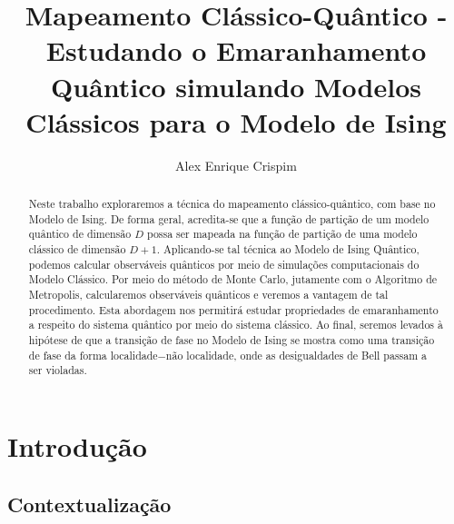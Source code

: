 

\newtheorem{theorem}{Teorema}

\newcommand{\conf}[1]{ \{ #1 \} }
\newcommand{\sconf}{\conf{\sigma}}
\newcommand{\sz}{\hat{\sigma}^z}
\newcommand{\sx}{\hat{\sigma}^x}
\newcommand{\sy}{\hat{\sigma}^y}
\newcommand{\aOper}{\hat{a}}
\newcommand{\aDagg}{\aOper^\dagger}
\newcommand{\cOpr}{\hat{c}}
\newcommand{\cDagg}{\cOper^\dagger}
\newcommand{\bq}{\beta_q}
\newcommand{\bcl}{\beta_{cl}}
\newcommand{\ham}{\hat{H}}
\newcommand{\oper}{\mathcal{O}}

\usepackage{tensor}

\title{Mapeamento Clássico-Quântico - Estudando o Emaranhamento Quântico  simulando Modelos Clássicos para o Modelo de Ising}
\author{Alex Enrique Crispim}

\begin{abstract}
Neste trabalho exploraremos a técnica do mapeamento clássico-quântico, com base no Modelo de Ising. De forma geral, acredita-se que a função de partição de um modelo quântico de dimensão $D$ possa ser mapeada na função de partição de uma modelo clássico de dimensão $D+1$. Aplicando-se tal técnica ao Modelo de Ising Quântico, podemos calcular observáveis quânticos por meio de simulações computacionais do Modelo Clássico. Por meio do método de Monte Carlo, jutamente com o Algoritmo de Metropolis, calcularemos observáveis quânticos e veremos a vantagem de tal procedimento. Esta abordagem nos permitirá estudar propriedades de emaranhamento a respeito do sistema quântico por meio do sistema clássico. Ao final, seremos levados à hipótese de que a transição de fase no Modelo de Ising se mostra como uma transição de fase da forma localidade$-$não localidade, onde as desigualdades de Bell passam a ser violadas.
\end{abstract}

\maketitle

\tableofcontents

\section{Introdução}
\label{sec:Introducao}

\subsection{Contextualização} 
\label{subsec:Contextualizacao}

